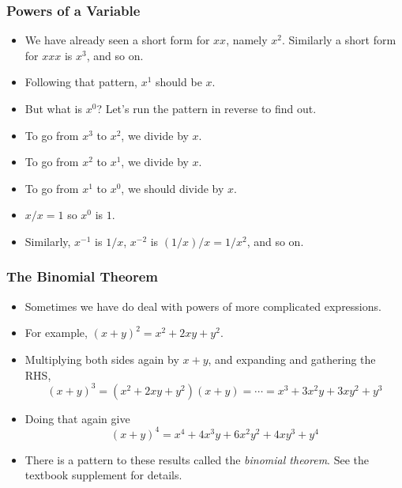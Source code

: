 \documentclass[serif,ignorenonframetext]{beamer}
\begin{document}
\begin{frame}
  \frametitle{Powers of a Variable}
  \begin{itemize}[<+->]
  \item We have already seen a short form for $xx$, namely $x^2$.
    Similarly a short form for $xxx$ is $x^3$, and so on.
  \item Following that pattern, $x^1$ should be $x$.
  \item But what is $x^0$?  Let's run the pattern in reverse to find
    out.
  \item To go from $x^3$ to $x^2$, we divide by $x$.
  \item To go from $x^2$ to $x^1$, we divide by $x$.
  \item To go from $x^1$ to $x^0$, we should divide by $x$.  
  \item $x/x=1$ so $x^0$ is $1$.
  \item Similarly, $x^{-1}$ is $1/x$, $x^{-2}$ is $(1/x)/x = 1/x^2$,
    and so on.
  \end{itemize}
\end{frame}

\begin{frame}
  \frametitle{The Binomial Theorem}
  \begin{itemize}[<+->]
  \item Sometimes we have do deal with powers of more complicated
    expressions.
  \item For example, $(x+y)^2=x^2+2xy+y^2$.
  \item Multiplying both sides again by $x+y$, and expanding and
    gathering the RHS,
    \begin{equation*}
      (x+y)^3 = (x^2+2xy+y^2)(x+y) = \cdots = x^3+3x^2y+3xy^2+y^3
    \end{equation*}
  \item Doing that again give
    \begin{equation*}
      (x+y)^4 = x^4 + 4x^3y + 6x^2y^2 + 4xy^3 + y^4
    \end{equation*}
  \item There is a pattern to these results called the
    \textit{binomial theorem}.  See the textbook supplement for details.
  \end{itemize}
\end{frame}
\end{document}

